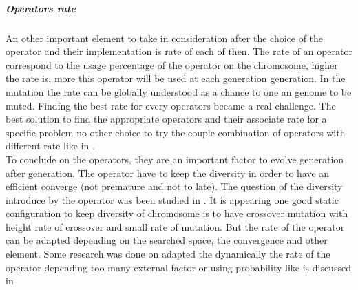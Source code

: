 

\subparagraph{Operators rate}
 An other important element to take in consideration after the choice of the operator and their implementation is  rate of each of then. 
The rate of an operator correspond to the usage percentage of the operator on the chromosome, higher the rate is,  more this operator will be used at each generation generation. 
In the mutation the rate can be globally understood as a chance to one an genome to be muted. 
Finding the  best rate for every operators became a real challenge. The best solution to find the appropriate  operators and their associate rate for a specific problem no other choice to try the couple combination of operators with different rate like in \cite{73*wright1991,71*grefenstette1986,133*schwefel1984}.\\

 To conclude on the operators, they are an important factor to evolve generation after generation.  The operator have to keep the diversity  in order to have an efficient converge (not premature and not to late). The question of the diversity introduce by the operator was been studied in  \cite{80*serpell2010,95*miller1995} \cite{113*mais2010}. 
 It is appearing one good static configuration to keep diversity \cite{64*matsui1999} of chromosome is to have crossover mutation with height rate of crossover and small rate of mutation. 
But the rate of the operator can be adapted depending on the searched space, the convergence and other element. Some research was done on adapted the dynamically the rate of the operator depending too many external factor or using probability like is discussed in  \cite{110*eiben2003,133*schwefel1984,94*srinivas1994}



